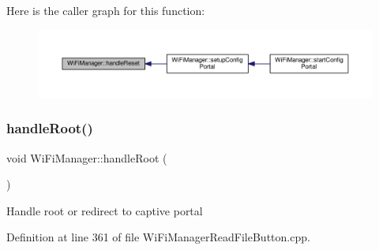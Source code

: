 Here is the caller graph for this function\+:\nopagebreak
\begin{figure}[H]
\begin{center}
\leavevmode
\includegraphics[width=350pt]{d4/dc8/class_wi_fi_manager_a94fb1a8fcfbd0d02714c69138bf72f9c_icgraph}
\end{center}
\end{figure}
\mbox{\label{class_wi_fi_manager_a47e4c7df7478f690c53ff9f5125c9760}} 
\subsubsection{\texorpdfstring{handle\+Root()}{handleRoot()}}
{\footnotesize\ttfamily void Wi\+Fi\+Manager\+::handle\+Root (\begin{DoxyParamCaption}{ }\end{DoxyParamCaption})\hspace{0.3cm}{\ttfamily [private]}}

Handle root or redirect to captive portal 

Definition at line 361 of file Wi\+Fi\+Manager\+Read\+File\+Button.\+cpp.


